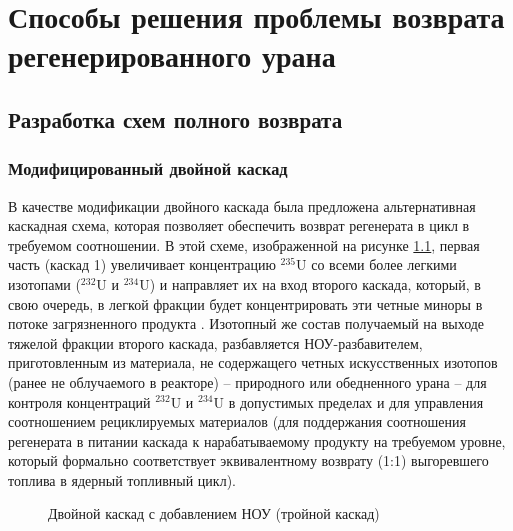 \chapter{Способы решения проблемы возврата регенерированного урана}\label{ch:ch3}

\section{Разработка схем полного возврата}\label{sec:ch2/sec3}
\subsection{Модифицированный двойной каскад}

В качестве модификации двойного каскада была предложена альтернативная каскадная схема, которая позволяет обеспечить возврат регенерата в цикл в требуемом соотношении. В этой схеме, изображенной 
на рисунке \ref{fig:vestnik}, первая часть (каскад 1) увеличивает 
концентрацию $^{235}$U со всеми более легкими изотопами ($^{232}$U и $^{234}$U) и направляет их на вход второго каскада, который, в свою очередь, в легкой фракции будет концентрировать эти четные миноры в потоке загрязненного продукта \cite{smirnovObogashchenieRegenerirovannogoUrana2018}.
Изотопный же состав получаемый на выходе тяжелой фракции второго каскада, разбавляется НОУ-разбавителем, приготовленным из материала, не содержащего четных искусственных изотопов (ранее не облучаемого в реакторе) -- природного или обедненного урана -- для контроля концентраций $^{232}$U и $^{234}$U в допустимых пределах и для управления соотношением рециклируемых материалов (для поддержания соотношения регенерата в питании каскада к нарабатываемому продукту на требуемом уровне, который формально соответствует эквивалентному возврату (1:1) выгоревшего топлива в ядерный топливный цикл).

\begin{figure}[ht]
  \caption{Двойной каскад с добавлением НОУ (тройной каскад)}\label{fig:vestnik}
\end{figure}


